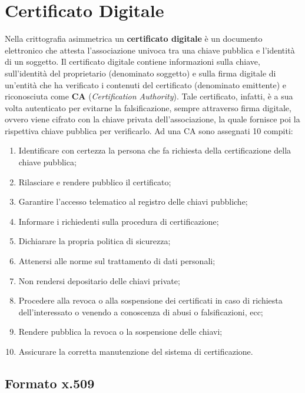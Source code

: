 \section{Certificato Digitale}

Nella crittografia asimmetrica un \textbf{certificato digitale} è un
documento elettronico che attesta
l'associazione univoca tra una chiave pubblica e l'identità di un soggetto.
Il certificato digitale contiene informazioni sulla chiave,
sull'identità del proprietario
(denominato soggetto) e sulla firma digitale di un'entità che ha verificato
i contenuti del certificato
(denominato emittente) e riconosciuta come \textbf{CA}
(\textit{Certification Authority}).
Tale certificato, infatti, è
a sua volta autenticato per evitarne la falsificazione, sempre attraverso
firma digitale, ovvero viene
cifrato con la chiave privata dell'associazione, la quale fornisce poi la
rispettiva chiave pubblica per
verificarlo.
Ad una CA sono assegnati 10 compiti:
\begin{enumerate}
    \item Identificare con certezza la persona che fa richiesta della certificazione della chiave
          pubblica;
    \item Rilasciare e rendere pubblico il certificato;
    \item Garantire l'accesso telematico al registro delle chiavi pubbliche;
    \item Informare i richiedenti sulla procedura di certificazione;
    \item Dichiarare la propria politica di sicurezza;
    \item Attenersi alle norme sul trattamento di dati personali;
    \item Non rendersi depositario delle chiavi private;
    \item Procedere alla revoca o alla sospensione dei certificati in caso di richiesta dell'interessato o
          venendo a conoscenza di abusi o falsificazioni, ecc;
    \item Rendere pubblica la revoca o la sospensione delle chiavi;
    \item Assicurare la corretta manutenzione del sistema di certificazione.
\end{enumerate}

\subsection{Formato x.509}

